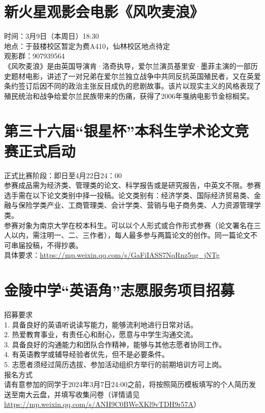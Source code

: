\documentclass[letterpaper, 12pt]{article}
\begin{document}
\begin{multicols}{2}
\section{新火星观影会电影《风吹麦浪》}
时间：3月9日（本周日）18:30\\
地点：于鼓楼校区暂定为费A410，仙林校区地点待定\\
观影群：907939564\\
《风吹麦浪》是由英国导演肯·洛奇执导，爱尔兰演员基里安·墨菲主演的一部历史题材电影，讲述了一对兄弟在爱尔兰独立战争中共同反抗英国殖民者，又在英爱条约签订后因不同的政治主张反目成仇的悲剧故事。该片以现实主义的风格表现了殖民统治和战争给爱尔兰民族带来的伤痛，获得了2006年戛纳电影节金棕榈奖。\\


\section{第三十六届“银星杯”本科生学术论文竞赛正式启动}
正式比赛阶段：即日至4月22日24：00\\
参赛成品需为经济类、管理类的论文、科学报告或是研究报告，中英文不限。参赛选手需在以下论文类别中择一投稿。论文类别有：经济学类、国际经济贸易类、金融与保险学类产业、工商管理类、会计学类、营销与电子商务类、人力资源管理学类。\\
参赛对象为南京大学在校本科生。可以以个人形式或合作形式参赛（论文署名在三人以内，需注明一、二、三作者），每人最多参与两篇论文的创作。同一篇论文不可串届投稿，不得抄袭。\\
具体要求：\url{https://mp.weixin.qq.com/s/GaFiIASS7NqRnz5ug_jNTg}


\section{金陵中学“英语角”志愿服务项目招募}
招募要求\\
1. 具备良好的英语听说读写能力，能够流利地进行日常对话。\\
2. 热爱教育事业，有责任心和耐心，愿意与中学生沟通交流。\\
3. 具备良好的沟通能力和团队合作精神，能够与其他志愿者协同工作。\\
4. 有英语教学或辅导经验者优先，但不是必要条件。\\
5. 志愿者须经过简历选拔、参加活动组织方举行的前期培训方可上岗。\\
报名方式\\
请有意参加的同学于2024年3月7日24:00之前，将按照简历模板填写的个人简历发送至南大云盘，并填写收集问卷（详情请见\url{https://mp.weixin.qq.com/s/ANH9C0BWeXKl9vTDH9r57A}）\\


\end{multicols}
\end{document}
